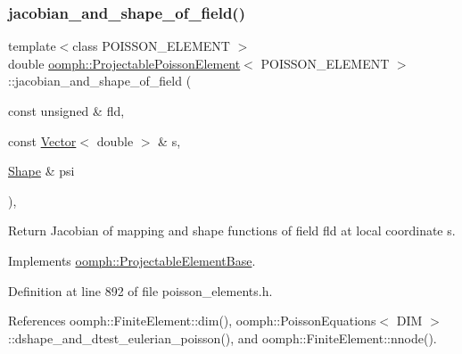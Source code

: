 \subsubsection{\texorpdfstring{jacobian\+\_\+and\+\_\+shape\+\_\+of\+\_\+field()}{jacobian\_and\_shape\_of\_field()}}
{\footnotesize\ttfamily template$<$class P\+O\+I\+S\+S\+O\+N\+\_\+\+E\+L\+E\+M\+E\+NT $>$ \\
double \hyperlink{classoomph_1_1ProjectablePoissonElement}{oomph\+::\+Projectable\+Poisson\+Element}$<$ P\+O\+I\+S\+S\+O\+N\+\_\+\+E\+L\+E\+M\+E\+NT $>$\+::jacobian\+\_\+and\+\_\+shape\+\_\+of\+\_\+field (\begin{DoxyParamCaption}\item[{const unsigned \&}]{fld,  }\item[{const \hyperlink{classoomph_1_1Vector}{Vector}$<$ double $>$ \&}]{s,  }\item[{\hyperlink{classoomph_1_1Shape}{Shape} \&}]{psi }\end{DoxyParamCaption})\hspace{0.3cm}{\ttfamily [inline]}, {\ttfamily [virtual]}}



Return Jacobian of mapping and shape functions of field fld at local coordinate s. 



Implements \hyperlink{classoomph_1_1ProjectableElementBase_ad45c21b58c0985d52f68ab2d79cbb488}{oomph\+::\+Projectable\+Element\+Base}.



Definition at line 892 of file poisson\+\_\+elements.\+h.



References oomph\+::\+Finite\+Element\+::dim(), oomph\+::\+Poisson\+Equations$<$ D\+I\+M $>$\+::dshape\+\_\+and\+\_\+dtest\+\_\+eulerian\+\_\+poisson(), and oomph\+::\+Finite\+Element\+::nnode().

\mbox{\label{classoomph_1_1ProjectablePoissonElement_af13ec8e584c3ab11cb501030220fcb87}} 
